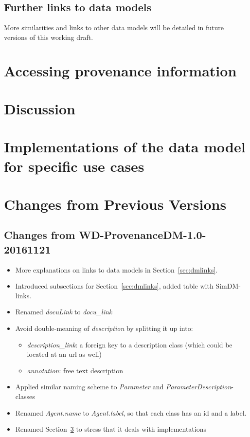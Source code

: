 \documentclass[11pt,a4paper]{ivoa}
\begin{document}
\subsection{Further links to data models}
More similarities and links to other data models will be detailed in future 
versions of this working draft.


\section{Accessing provenance information}


\section{Discussion}


\section{Implementations of the data model for specific use cases}\label{sec:usecases-implementations}



\appendix
\section{Changes from Previous Versions}
\subsection{Changes from WD-ProvenanceDM-1.0-20161121}
\begin{itemize}
\item More explanations on links to data models in Section~\ref{sec:dmlinks}.
\item Introduced subsections for Section~\ref{sec:dmlinks}, added table with SimDM-links.
\item Renamed \emph{docuLink} to \emph{docu\_link}
\item Avoid double-meaning of \emph{description} by splitting it up into: 
    \begin{itemize}
    \item \emph{description\_link}: a foreign key to a description class 
(which could be located at an url as well)
    \item \emph{annotation}: free text description
    \end{itemize}
\item Applied similar naming scheme to \emph{Parameter} and \emph{ParameterDescription}-classes
\item Renamed \emph{Agent.name} to \emph{Agent.label}, so that each class has an id and a label.
\item Renamed Section~\ref{sec:usecases-implementations} to stress that it deals with implementations


\end{itemize}
\end{document}
